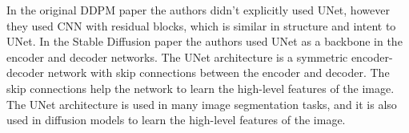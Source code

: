 In the original DDPM paper \cite{ddpm} the authors didn't explicitly used UNet, however they used CNN with residual blocks, which is similar in structure and intent to UNet. In the Stable Diffusion paper \cite{stable_diffusion} the authors used UNet as a backbone in the encoder and decoder networks. The UNet architecture is a symmetric encoder-decoder network with skip connections between the encoder and decoder. The skip connections help the network to learn the high-level features of the image. The UNet architecture is used in many image segmentation tasks, and it is also used in diffusion models to learn the high-level features of the image.